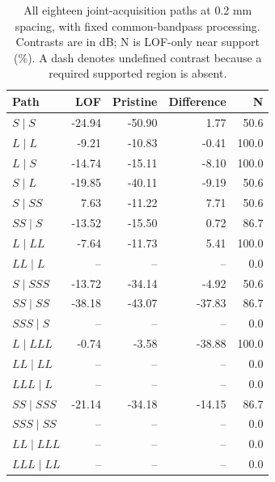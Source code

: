 \begin{table}[htbp]\centering\small
\caption{All eighteen joint-acquisition paths at 0.2 mm spacing, with fixed common-bandpass processing. Contrasts are in dB; N is LOF-only near support (\%). A dash denotes undefined contrast because a required supported region is absent.}
\label{saftapp:archive:partial:joint_paths}
\begin{tabular}{@{}lrrrr@{}}\toprule
Path & LOF & Pristine & Difference & N\\\midrule
$S\mid S$ & -24.94 & -50.90 & 1.77 & 50.6 \\
$L\mid L$ & -9.21 & -10.83 & -0.41 & 100.0 \\
$L\mid S$ & -14.74 & -15.11 & -8.10 & 100.0 \\
$S\mid L$ & -19.85 & -40.11 & -9.19 & 50.6 \\
$S\mid SS$ & 7.63 & -11.22 & 7.71 & 50.6 \\
$SS\mid S$ & -13.52 & -15.50 & 0.72 & 86.7 \\
$L\mid LL$ & -7.64 & -11.73 & 5.41 & 100.0 \\
$LL\mid L$ & -- & -- & -- & 0.0 \\
$S\mid SSS$ & -13.72 & -34.14 & -4.92 & 50.6 \\
$SS\mid SS$ & -38.18 & -43.07 & -37.83 & 86.7 \\
$SSS\mid S$ & -- & -- & -- & 0.0 \\
$L\mid LLL$ & -0.74 & -3.58 & -38.88 & 100.0 \\
$LL\mid LL$ & -- & -- & -- & 0.0 \\
$LLL\mid L$ & -- & -- & -- & 0.0 \\
$SS\mid SSS$ & -21.14 & -34.18 & -14.15 & 86.7 \\
$SSS\mid SS$ & -- & -- & -- & 0.0 \\
$LL\mid LLL$ & -- & -- & -- & 0.0 \\
$LLL\mid LL$ & -- & -- & -- & 0.0 \\

\bottomrule\end{tabular}
\end{table}

